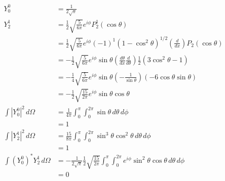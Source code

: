 \documentclass{article}
\begin{document}
\begin{align*}
  Y_0^0                           & = \frac{1}{2 \sqrt{\pi}}                                                                                                                              \\
  Y_2^1                           & = \frac{1}{2} \sqrt{\frac{5}{6 \pi}} e^{i \phi} P_2^1(\cos \theta)                                                                                    \\
                                  & = \frac{1}{2} \sqrt{\frac{5}{6 \pi}} e^{i \phi} (-1)^1 (1 - \cos^2 \theta)^{1 / 2} \left( \frac{d}{d x} \right) P_2(\cos \theta)                      \\
                                  & = -\frac{1}{2} \sqrt{\frac{5}{6 \pi}} e^{i \phi} \sin \theta \left( \frac{d \theta}{d x} \frac{d}{d \theta} \right) \frac{1}{2} (3 \cos^2 \theta - 1) \\
                                  & = -\frac{1}{4} \sqrt{\frac{5}{6 \pi}} e^{i \phi} \sin \theta \left( -\frac{1}{\sin \theta} \right) (-6 \cos \theta \sin \theta)                       \\
                                  & = -\frac{1}{2} \sqrt{\frac{15}{2 \pi}} e^{i \phi} \sin \theta \cos \theta                                                                             \\
  \int |Y_0^0|^2 \,d \Omega       & = \frac{1}{4 \pi} \int_0^\pi \int_0^{2 \pi} \sin \theta \,d \theta \,d \phi                                                                           \\
                                  & = 1                                                                                                                                                   \\
  \int |Y_2^1|^2 \,d \Omega       & = \frac{15}{8 \pi} \int_0^\pi \int_0^{2 \pi} \sin^3 \theta \cos^2 \theta \,d \theta \,d \phi                                                          \\
                                  & = 1                                                                                                                                                   \\
  \int (Y_0^0)^* Y_2^1 \,d \Omega & = -\frac{1}{2 \sqrt{\pi}} \frac{1}{2} \sqrt{\frac{15}{2 \pi}} \int_0^\pi \int_0^{2 \pi} e^{i \phi} \sin^2 \theta \cos \theta \,d \theta \,d \phi      \\
                                  & = 0
\end{align*}
\end{document}
